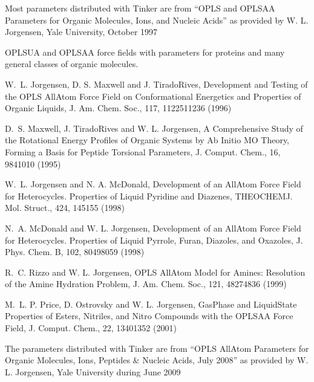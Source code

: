 \documentclass[letterpaper,11pt,english]{sphinxmanual}
\begin{document}
\sphinxAtStartPar
Most parameters distributed with Tinker are from “OPLS and OPLS\sphinxhyphen{}AA Parameters for Organic Molecules, Ions, and Nucleic Acids” as provided by W. L. Jorgensen, Yale University, October 1997

\sphinxAtStartPar
{}

\sphinxAtStartPar
OPLS\sphinxhyphen{}UA and OPLS\sphinxhyphen{}AA force fields with parameters for proteins and many general classes of organic molecules.

\sphinxAtStartPar
W. L. Jorgensen, D. S. Maxwell and J. Tirado\sphinxhyphen{}Rives, Development and Testing of the OPLS All\sphinxhyphen{}Atom Force Field on Conformational Energetics and Properties of Organic Liquids, J. Am. Chem. Soc., 117, 11225\sphinxhyphen{}11236 (1996)

\sphinxAtStartPar
D. S. Maxwell, J. Tirado\sphinxhyphen{}Rives and W. L. Jorgensen, A Comprehensive Study of the Rotational Energy Profiles of Organic Systems by Ab Initio MO Theory, Forming a Basis for Peptide Torsional Parameters, J. Comput. Chem., 16, 984\sphinxhyphen{}1010 (1995)

\sphinxAtStartPar
W. L. Jorgensen and N. A. McDonald, Development of an All\sphinxhyphen{}Atom Force Field for Heterocycles. Properties of Liquid Pyridine and Diazenes, THEOCHEM\sphinxhyphen{}J. Mol. Struct., 424, 145\sphinxhyphen{}155 (1998)

\sphinxAtStartPar
N. A. McDonald and W. L. Jorgensen, Development of an All\sphinxhyphen{}Atom Force Field for Heterocycles. Properties of Liquid Pyrrole, Furan, Diazoles, and Oxazoles, J. Phys. Chem. B, 102, 8049\sphinxhyphen{}8059 (1998)

\sphinxAtStartPar
R. C. Rizzo and W. L. Jorgensen, OPLS All\sphinxhyphen{}Atom Model for Amines: Resolution of the Amine Hydration Problem, J. Am. Chem. Soc., 121, 4827\sphinxhyphen{}4836 (1999)

\sphinxAtStartPar
M. L. P. Price, D. Ostrovsky and W. L. Jorgensen, Gas\sphinxhyphen{}Phase and Liquid\sphinxhyphen{}State Properties of Esters, Nitriles, and Nitro Compounds with the OPLS\sphinxhyphen{}AA Force Field, J. Comput. Chem., 22, 1340\sphinxhyphen{}1352 (2001)

\sphinxAtStartPar
The parameters distributed with Tinker are from “OPLS All\sphinxhyphen{}Atom Parameters for Organic Molecules, Ions, Peptides \& Nucleic Acids, July 2008” as provided by W. L. Jorgensen, Yale University during June 2009

\sphinxAtStartPar
{}
\end{document}
